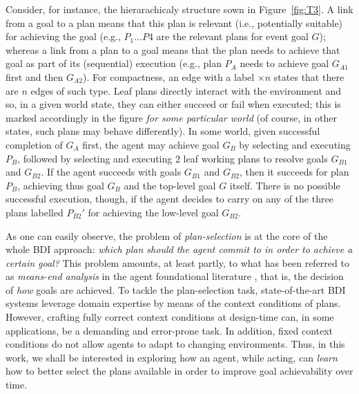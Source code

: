 Consider, for instance, the hierarachicaly structure sown in Figure~\ref{fig:T3}.
A link from a goal to a plan means that this plan is relevant (i.e., potentially
suitable) for achieving the goal (e.g., $P_1 \ldots P4$ are the relevant plans
for event goal $G$); whereas a link from a plan to a goal means that the plan
needs to achieve that goal as part of its (sequential) execution (e.g., plan
$P_A$ needs to achieve goal $G_{A1}$ first and then $G_{A2}$).
For compactness, an edge with a label $\times n$ states that there are $n$ edges
of such type.
Leaf plans directly interact with the environment and so, in a given world state,
they can either succeed or fail when executed; this is marked accordingly in the
figure \emph{for some particular world} (of course, in other states, such plans
may behave differently).
In some world, given successful completion of $G_A$ first, the agent may achieve
goal $G_B$ by selecting and executing $P_B$, followed by selecting and executing
$2$ leaf working plans to resolve goals $G_{B1}$ and $G_{B2}$. If the agent
succeeds with goals $G_{B1}$ and $G_{B2}$, then it succeeds for plan $P_B$,
achieving thus goal $G_B$ and the top-level goal $G$ itself. There is no possible
successful execution, though, if the agent decides to carry on any of the three
plans labelled $P_{B2}'$ for achieving the low-level goal $G_{B2}$.





As one can easily observe, the problem of \textit{plan-selection} is at the core
of the whole BDI approach:
\emph{which plan should the agent commit to in order to achieve a certain goal?}
This problem amounts, at least partly, to what has been referred to as
\emph{means-end analysis} in the agent foundational literature
\cite{Pollack92-IRMA,Bratman88}, that is, the decision of \textit{how} goals are
achieved.
To tackle the plan-selection task, state-of-the-art BDI systems leverage domain
expertise by means of the context conditions of plans. However, crafting fully
correct context conditions at design-time can, in some applications, be a
demanding and error-prone task. In addition, fixed context conditions do not
allow agents to adapt to changing environments.
 Thus, in this work, we shall be interested in
exploring how an agent, while acting, can \emph{learn} how to better select the
plans available in order to improve goal achievability over time.






